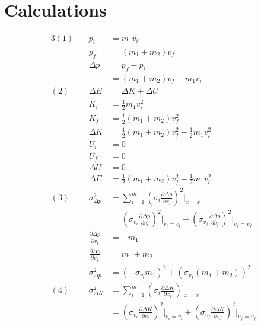 \documentclass[12pt]{article}
\begin{document}
    \section{Calculations}
        \begin{alignat*}{3}
            (1)~
            &&p_i &= m_1v_i\\
            &&p_f &= (m_1 + m_2)v_f\\
            &&\Delta p &= p_f - p_i\\
            &&& = (m_1 + m_2)v_f - m_1v_i\\
            (2)~
            &&\Delta E &= \Delta K + \Delta U\\
            &&K_i &= \frac{1}{2} m_1 v_i^2\\ 
            &&K_f &= \frac{1}{2} (m_1+m_2)v_f^2\\
            &&\Delta K &= \frac{1}{2} (m_1+m_2)v_f^2 - \frac{1}{2} m_1 v_i^2\\
            &&U_i &= 0\\
            &&U_f &= 0\\
            &&\Delta U &= 0\\
            &&\Delta E &= \frac{1}{2} (m_1+m_2)v_f^2 - \frac{1}{2} m_1 v_i^2\\
            (3)~
            &&\sigma^2_{\Delta p} &= \sum_{i=1}^m \left(\sigma_i \frac{\partial \Delta p}{\partial x_i}\right)^2\bigg\rvert_{x=\overline{x}}\\
            &&& = \left(\sigma_{v_i} \frac{\partial \Delta p}{\partial v_i}\right)^2\bigg\rvert_{v_i=\overline{v}_i}+  \left(\sigma_{v_f} \frac{\partial \Delta p}{\partial \overline{v}_f}\right)^2\bigg\rvert_{v_f=\overline{v}_f}\\
            &&\frac{\partial \Delta p}{\partial v_i} &= -m_1\\
            &&\frac{\partial \Delta p}{\partial v_f} &= m_1 + m_2\\
            &&\sigma^2_{\Delta p} &= \left(-\sigma_{v_i}m_1 \right)^2+  \left(\sigma_{v_f} (m_1 + m_2) \right)^2\\
            (4)~
            &&\sigma^2_{\Delta K} &= \sum_{i=1}^m \left(\sigma_i \frac{\partial \Delta K}{\partial x_i}\right)\bigg\rvert_{x=\overline{x}}\\
            &&& = \left(\sigma_{v_i} \frac{\partial \Delta K}{\partial v_i}\right)^2\bigg\rvert_{v_i=\overline{v}_i}+  \left(\sigma_{v_f} \frac{\partial \Delta K}{\partial \overline{v}_f}\right)^2\bigg\rvert_{v_f=\overline{v}_f}\\

\end{alignat*}
\end{document}
